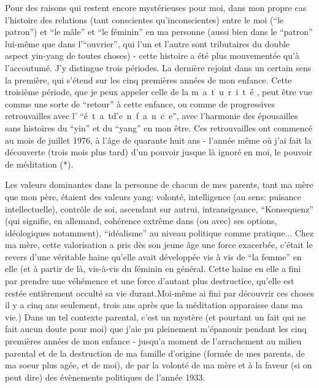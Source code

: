 Pour des raisons qui restent encore mystérieuses pour moi, dans mon propre cas l'histoire des relations (tant conscientes qu'inconscientes) entre le moi (``le patron'')\handwritten{,} et ``le mâle'' et ``le féminin'' en ma personne (aussi bien dans le ``patron'' lui-même que dans l'``ouvrier'', qui l'un et l'autre sont tributaires du double aspect yin-yang de toutes choses) - cette histoire a été plus mouvementée qu'à l'accoutumé. J'y distingue trois périodes. La dernière rejoint dans un certain sens la première, qui s'étend sur les cinq premières années de mon enfance. Cette troisième période, que je peux appeler celle de la \mbox{m a t u r i t é} , peut être vue comme une sorte de ``retour'' à cette enfance, ou comme de progressives retrouvailles avec l' ``\mbox{é t a t\quad d'\quad e n f a n c e}'', avec l'harmonie des épousailles sans histoires du ``yin'' et du ``yang'' en mon être. Ces retrouvailles ont commencé au mois de juillet 1976, à l'âge de quarante huit ans - l'année même où j'ai fait la découverte (trois mois plus tard) d'un pouvoir jusque là ignoré en moi, le pouvoir de méditation (*).

Les valeurs dominantes dans la personne de chacun de mes parents, tant ma mère que mon père, étaient des valeurs yang: volonté, intelligence (au sens: puisance intellectuelle), contrôle de soi, ascendant sur autrui, intransigeance, ``Konsequenz'' (qui signifie, en allemand, cohérence extrême dans (ou avec) ses options, idéologiques notamment), ``idéalisme'' au niveau politique comme pratique... Chez ma mère, cette valorisation a pris dès son jeune âge une force exacerbée, c'était le revers d'une véritable haine qu'elle avait développée vis à vis de ``la femme'' en elle (et à partir de là, vis-à-vis du féminin en général\unsure{:}\handwritten{)}. Cette haine en elle a fini par prendre une véhémence et une force d'autant plus destructice, qu'elle est restée entièrement occulté sa vie durant.\handwritten{(}Moi-même ai fini par découvrir ces choses il y a cinq ans seulement, trois ans après que la méditation apparaisse dans ma vie.) Dans un tel contexte parental, c'est un mystère (et pourtant un fait qui ne fait aucun doute pour moi) que j'aie pu pleinement m'épanouir pendant les cinq premières années de mon enfance - jusqu'a moment de l'arrachement au milieu parental et de la destruction de ma famille d'origine (formée de mes parents, de ma soeur plus agée, et de moi), de par la volonté de ma mère et à la faveur (si on peut dire) des évènements politiques de l'année 1933.

